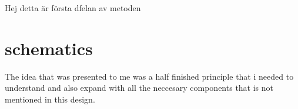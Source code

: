 Hej detta är första dfelan av metoden

\section{schematics}
The idea that was presented to me was a half finished principle that i needed to understand and also expand with all the neccesary components that is not mentioned in this design.
